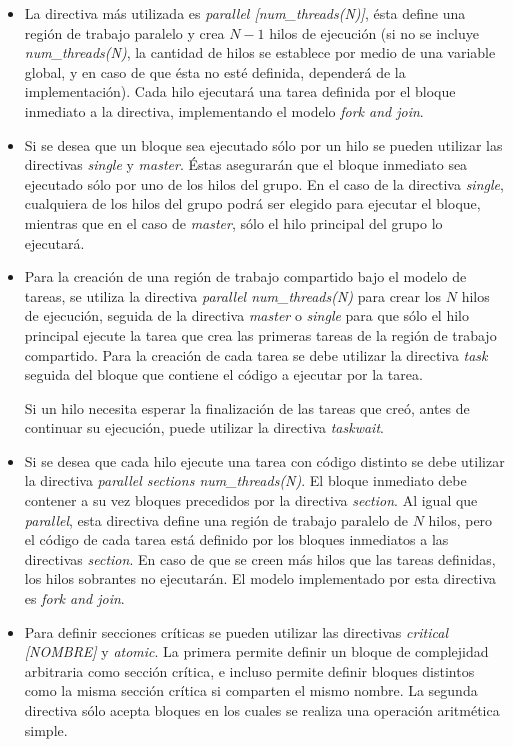 \begin{itemize}

	\item	La directiva más utilizada es \emph{parallel [num\_threads(N)]},
		ésta define una región de trabajo paralelo y crea $N-1$ hilos de
		ejecución (si no se incluye \emph{num\_threads(N)}, la cantidad
		de hilos se establece por medio de una variable global, y en
		caso de que ésta no esté definida, dependerá de la
		implementación). Cada hilo ejecutará una tarea definida por el
		bloque inmediato a la directiva, implementando el modelo
		\emph{fork and join}.

	\item	Si se desea que un bloque sea ejecutado sólo por un hilo se pueden
		utilizar las directivas \emph{single} y \emph{master}. Éstas
		asegurarán que el bloque inmediato sea ejecutado sólo por uno de
		los hilos del grupo. En el caso de la directiva \emph{single},
		cualquiera de los hilos del grupo podrá ser elegido para
		ejecutar el bloque, mientras que en el caso de \emph{master},
		sólo el hilo principal del grupo lo ejecutará.

	\item	Para la creación de una región de trabajo compartido bajo el
		modelo de tareas, se utiliza la directiva \emph{parallel
		num\_threads(N)} para crear los $N$ hilos de ejecución, seguida
		de la directiva \emph{master} o \emph{single} para que sólo el
		hilo principal ejecute la tarea que crea las primeras tareas de
		la región de trabajo compartido. Para la creación de cada tarea
		se debe utilizar la directiva \emph{task} seguida del bloque que
		contiene el código a ejecutar por la tarea.

		Si un hilo necesita esperar la finalización de las tareas que
		creó, antes de continuar su ejecución, puede utilizar la
		directiva \emph{taskwait}.

	\item	Si se desea que cada hilo ejecute una tarea con código distinto se
		debe utilizar la directiva \emph{parallel sections
		num\_threads(N)}. El bloque inmediato debe contener a su vez
		bloques precedidos por la directiva \emph{section}. Al igual que
		\emph{parallel}, esta directiva define una región de trabajo
		paralelo de $N$ hilos, pero el código de cada tarea está
		definido por los bloques inmediatos a las directivas
		\emph{section}. En caso de que se creen más hilos que las tareas
		definidas, los hilos sobrantes no ejecutarán. El modelo
		implementado por esta directiva es \emph{fork and join}.

	\item	Para definir secciones críticas se pueden utilizar las directivas
		\emph{critical [NOMBRE]} y \emph{atomic}. La primera permite
		definir un bloque de complejidad arbitraria como sección
		crítica, e incluso permite definir bloques distintos como la
		misma sección crítica si comparten el mismo nombre. La segunda
		directiva sólo acepta bloques en los cuales se realiza una
		operación aritmética simple.

\end{itemize}

